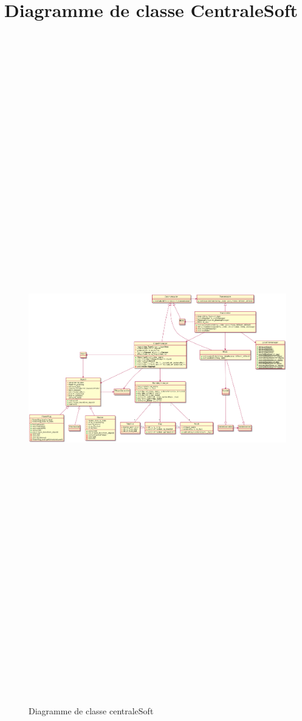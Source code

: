 \documentclass[11pt,a4paper]{report} %
\begin{document}
		\section{Diagramme de classe CentraleSoft}
		\begin{figure}[H]
			\centering
			\includegraphics[width = 18cm ,height = 30cm,keepaspectratio]{./Picture/Diagramme_de_class_C++.png}
			\caption{Diagramme de classe centraleSoft} 
			\label{diagClass}
		
			\end{figure}
			
\end{document}
